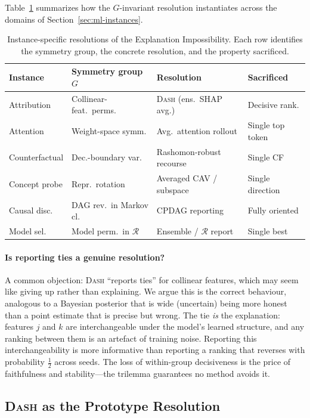 \documentclass[11pt,a4paper]{article}
\newcommand{\DASH}{\textsc{Dash}}
\begin{document}
Table~\ref{tab:resolutions} summarizes how the $G$-invariant resolution
instantiates across the domains of Section~\ref{sec:ml-instances}.

\begin{table}[t]
\centering
\caption{Instance-specific resolutions of the Explanation
  Impossibility.  Each row identifies the symmetry group, the concrete
  resolution, and the property sacrificed.}
\label{tab:resolutions}
\small
\setlength{\tabcolsep}{4pt}
\begin{tabular}{@{}llll@{}}
\toprule
Instance & Symmetry group $G$ & Resolution & Sacrificed \\
\midrule
Attribution & Collinear-feat.\ perms. & \DASH{} (ens.\ SHAP avg.) & Decisive rank. \\
Attention & Weight-space symm. & Avg.\ attention rollout & Single top token \\
Counterfactual & Dec.-boundary var. & Rashomon-robust recourse & Single CF \\
Concept probe & Repr.\ rotation & Averaged CAV / subspace & Single direction \\
Causal disc. & DAG rev.\ in Markov cl. & CPDAG reporting & Fully oriented \\
Model sel. & Model perm.\ in $\mathcal{R}$ & Ensemble / $\mathcal{R}$ report & Single best \\
\bottomrule
\end{tabular}
\end{table}

\paragraph{Is reporting ties a genuine resolution?}
A common objection: \DASH{} ``reports ties'' for collinear features, which may seem like giving up rather than explaining. We argue this is the correct behaviour, analogous to a Bayesian posterior that is wide (uncertain) being more honest than a point estimate that is precise but wrong. The tie \emph{is} the explanation: features $j$ and $k$ are interchangeable under the model's learned structure, and any ranking between them is an artefact of training noise. Reporting this interchangeability is more informative than reporting a ranking that reverses with probability $\tfrac{1}{2}$ across seeds. The loss of within-group decisiveness is the price of faithfulness and stability---the trilemma guarantees no method avoids it.

\subsection{\DASH{} as the Prototype Resolution}
\label{sec:dash-prototype}
\end{document}

